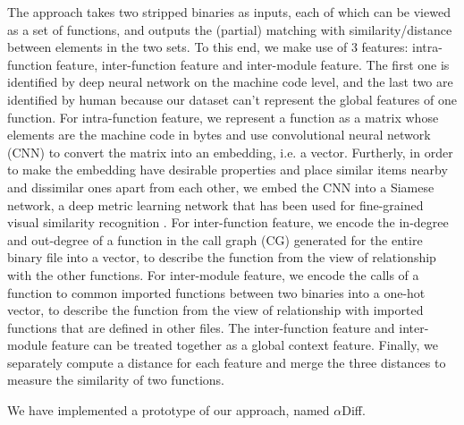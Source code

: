 \documentclass[10pt,conference]{IEEEtran}
\begin{document}
The approach takes two stripped binaries as inputs, each of which can be viewed as a set of functions, and outputs the (partial) matching with 
similarity/distance between elements in the two sets. 
To this end, we make use of 3 features: intra-function feature, inter-function feature and inter-module feature. 
The first one is identified by deep neural network on the machine code level, and the last two are identified by human because our 
dataset can’t represent the global features of one function. 
For intra-function feature, we represent a function as a matrix whose elements are the machine code in bytes and use convolutional 
neural network (CNN) to convert the matrix into an embedding, i.e. a vector. Furtherly, in order to make the embedding have desirable 
properties and place similar items nearby and dissimilar ones apart from each other, we embed the CNN into a Siamese network, 
a deep metric learning network that has been used for fine-grained visual similarity recognition
 \cite{bromley1994signature}\cite{bell2015learning}\cite{schroff2015facenet}\cite{song2016deep}.
For inter-function feature, we encode the in-degree and out-degree of a function in the call graph (CG) generated for the entire binary 
file into a vector, to describe the function from the view of relationship with the other functions. 
For inter-module feature, we encode the calls of a function to common imported functions between two binaries into a one-hot vector, 
to describe the function from the view of relationship with imported functions that are defined in other files. 
The inter-function feature and inter-module feature can be treated together as a global context feature. 
{\color{red}Finally, we separately compute a distance for each feature and merge the three distances to measure the similarity of two functions.} 

We have implemented a prototype of our approach, named $\alpha$Diff.
{}
\end{document}

